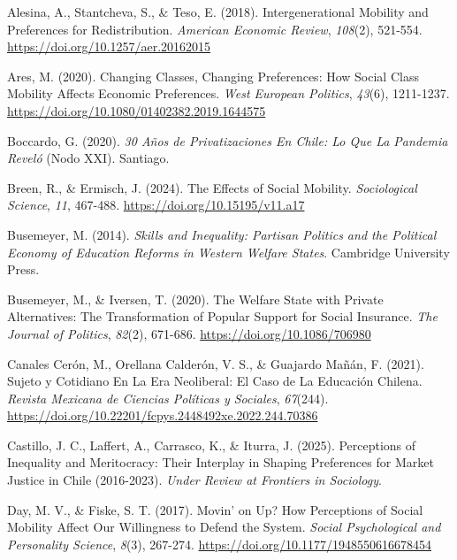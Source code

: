 \documentclass[
  spanish,
  letterpaper,
  DIV=11,
  numbers=noendperiod,
  oneside]{scrartcl}
\newlength{\cslhangindent}
\newenvironment{CSLReferences}[2] %
 {\begin{list}{}{%
  \setlength{\itemindent}{0pt}
  \setlength{\leftmargin}{0pt}
  \setlength{\parsep}{0pt}
  \ifodd #1
   \setlength{\leftmargin}{\cslhangindent}
   \setlength{\itemindent}{-1\cslhangindent}
  \fi
  \setlength{\itemsep}{#2\baselineskip}}}
 {\end{list}}
\begin{document}
\label{refs}
\begin{CSLReferences}{1}{0}
Alesina, A., Stantcheva, S., \& Teso, E. (2018). Intergenerational
{Mobility} and {Preferences} for {Redistribution}. \emph{American
Economic Review}, \emph{108}(2), 521-554.
\url{https://doi.org/10.1257/aer.20162015}

Ares, M. (2020). Changing Classes, Changing Preferences: How Social
Class Mobility Affects Economic Preferences. \emph{West European
Politics}, \emph{43}(6), 1211-1237.
\url{https://doi.org/10.1080/01402382.2019.1644575}

Boccardo, G. (2020). \emph{30 A{ñ}os de Privatizaciones En {Chile}: Lo
Que La Pandemia Revel{ó}} (Nodo XXI). Santiago.

Breen, R., \& Ermisch, J. (2024). The {Effects} of {Social Mobility}.
\emph{Sociological Science}, \emph{11}, 467-488.
\url{https://doi.org/10.15195/v11.a17}

Busemeyer, M. (2014). \emph{Skills and {Inequality}: {Partisan Politics}
and the {Political Economy} of {Education Reforms} in {Western Welfare
States}}. Cambridge University Press.

Busemeyer, M., \& Iversen, T. (2020). The {Welfare State} with {Private
Alternatives}: {The Transformation} of {Popular Support} for {Social
Insurance}. \emph{The Journal of Politics}, \emph{82}(2), 671-686.
\url{https://doi.org/10.1086/706980}

Canales Cerón, M., Orellana Calderón, V. S., \& Guajardo Mañán, F.
(2021). Sujeto y Cotidiano En La Era Neoliberal: El Caso de La
Educaci{ó}n Chilena. \emph{Revista Mexicana de Ciencias Pol{í}ticas y
Sociales}, \emph{67}(244).
\url{https://doi.org/10.22201/fcpys.2448492xe.2022.244.70386}

Castillo, J. C., Laffert, A., Carrasco, K., \& Iturra, J. (2025).
Perceptions of {Inequality} and {Meritocracy}: {Their Interplay} in
{Shaping Preferences} for {Market Justice} in {Chile} (2016-2023).
\emph{Under Review at Frontiers in Sociology}.

Day, M. V., \& Fiske, S. T. (2017). Movin' on {Up}? {How Perceptions} of
{Social Mobility Affect Our Willingness} to {Defend} the {System}.
\emph{Social Psychological and Personality Science}, \emph{8}(3),
267-274. \url{https://doi.org/10.1177/1948550616678454}


\end{CSLReferences}
\end{document}
